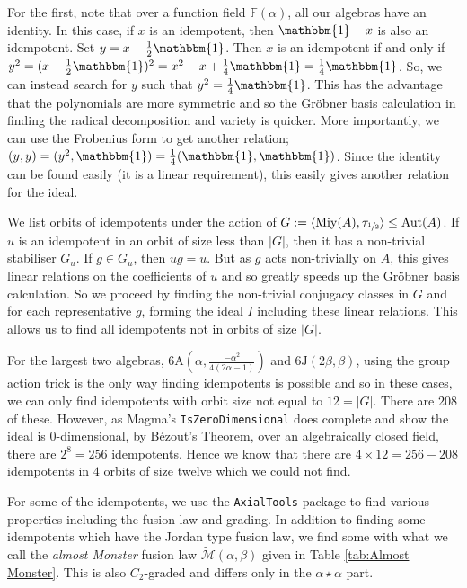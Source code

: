 \documentclass[11pt, a4paper]{article}
\theoremstyle{plain}
\theoremstyle{definition}
\newcommand\al{\alpha}
\newcommand\bt{\beta}
\newcommand\cM{\mathcal{M}}
\newcommand\la{\langle}
\newcommand\ra{\rangle}
\DeclareMathOperator{\Aut}{Aut}
\newcommand\FF{\mathbb{F}}
\newcommand{\A}{\mathrm{A}}
\newcommand{\J}{\mathrm{J}}
\DeclareMathOperator{\Miy}{Miy}
\newcommand{\0}{\overline{0}}
\newcommand{\2}{\overline{2}}
\newcommand{\half}{{\tau_{\sfrac{1}{2}}}} %
\newcommand{\1}{\mathbbm{1}}
\newcommand{\cAM}{\widetilde{\cM}}
\begin{document}
For the first, note that over a function field $\FF(\al)$, all our algebras have an identity.  In this case, if $x$ is an idempotent, then $\1-x$ is also an idempotent.  Set $y = x -\frac{1}{2} \1$.  Then $x$ is an idempotent if and only if $y^2 = ( x-\frac{1}{2} \1)^2 = x^2 - x + \frac{1}{4} \1 = \frac{1}{4} \1$.  So, we can instead search for $y$ such that $y^2 = \frac{1}{4}\1$.  This has the advantage that the polynomials are more symmetric and so the Gr\"obner basis calculation in finding the radical decomposition and variety is quicker.  More importantly, we can use the Frobenius form to get another relation; $(y,y) = (y^2, \1) = \frac{1}{4}(\1,\1)$.  Since the identity can be found easily (it is a linear requirement), this easily gives another relation for the ideal.

We list orbits of idempotents under the action of $G := \la \Miy(A), \half\ra \leq \Aut(A)$.  If $u$ is an idempotent in an orbit of size less than $|G|$, then it has a non-trivial stabiliser $G_u$.  If $g \in G_u$, then $ug = u$.  But as $g$ acts non-trivially on $A$, this gives linear relations on the coefficients of $u$ and so greatly speeds up the Gr\"obner basis calculation.  So we proceed by finding the non-trivial conjugacy classes in $G$ and for each representative $g$, forming the ideal $I$ including these linear relations.  This allows us to find all idempotents not in orbits of size $|G|$.

For the largest two algebras, $6\A(\al, \frac{-\al^2}{4(2\al-1)})$ and $6\J(2\bt, \bt)$, using the group action trick is the only way finding idempotents is possible and so in these cases, we can only find idempotents with orbit size not equal to $12 = |G|$.  There are $208$ of these.  However, as Magma's \texttt{IsZeroDimensional} does complete and show the ideal is $0$-dimensional, by B\'ezout's Theorem, over an algebraically closed field, there are $2^8 = 256$ idempotents.  Hence we know that there are $4 \times 12 = 256-208$ idempotents in $4$ orbits of size twelve which we could not find.

For some of the idempotents, we use the \texttt{AxialTools} package \cite{AxialTools} to find various properties including the fusion law and grading.  In addition to finding some idempotents which have the Jordan type fusion law, we find some with what we call the \emph{almost Monster} fusion law $\cAM(\al, \bt)$ given in Table \ref{tab:Almost Monster}.  This is also $C_2$-graded and differs only in the $\al \star \al$ part. 
\end{document}
